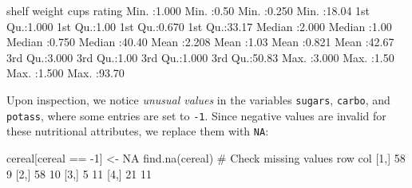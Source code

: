 \documentclass[
  11pt,
]{book}
\makeatletter
\newenvironment{Shaded}{}{}
\newcommand{\CommentTok}[1]{\textcolor[rgb]{0.36,0.36,0.36}{#1}}
\newcommand{\ConstantTok}[1]{#1}
\newcommand{\DecValTok}[1]{#1}
\newcommand{\FloatTok}[1]{#1}
\newcommand{\FunctionTok}[1]{#1}
\newcommand{\NormalTok}[1]{#1}
\newcommand{\OtherTok}[1]{\textcolor[rgb]{0.39,0.39,0.39}{#1}}
\newcommand{\SpecialCharTok}[1]{\textcolor[rgb]{0.39,0.39,0.39}{#1}}
\newenvironment{kframe}{%
\medskip{}
\setlength{\fboxsep}{.8em}
 \def\at@end@of@kframe{}%
 \ifinner\ifhmode%
  \def\at@end@of@kframe{\end{minipage}}%
  \begin{minipage}{\columnwidth}%
 \fi\fi%
 \def\FrameCommand##1{\hskip\@totalleftmargin \hskip-\fboxsep
 \colorbox{shadecolor}{##1}\hskip-\fboxsep
     \hskip-\linewidth \hskip-\@totalleftmargin \hskip\columnwidth}%
 \MakeFramed {\advance\hsize-\width
   \@totalleftmargin\z@ \linewidth\hsize
   \@setminipage}}%
 {\par\unskip\endMakeFramed%
 \at@end@of@kframe}
\renewenvironment{Shaded}{\begin{kframe}}{\end{kframe}}
\theoremstyle{definition}
\theoremstyle{definition}
\theoremstyle{definition}
\theoremstyle{definition}
\theoremstyle{remark}
\makeatother
\begin{document}
\begin{Shaded}
\begin{Highlighting}[]
\NormalTok{        shelf           weight          cups           rating     }
\NormalTok{    Min.   }\SpecialCharTok{:}\FloatTok{1.000}\NormalTok{   Min.   }\SpecialCharTok{:}\FloatTok{0.50}\NormalTok{   Min.   }\SpecialCharTok{:}\FloatTok{0.250}\NormalTok{   Min.   }\SpecialCharTok{:}\FloatTok{18.04}  
    \DecValTok{1}\NormalTok{st Qu.}\SpecialCharTok{:}\FloatTok{1.000}   \DecValTok{1}\NormalTok{st Qu.}\SpecialCharTok{:}\FloatTok{1.00}   \DecValTok{1}\NormalTok{st Qu.}\SpecialCharTok{:}\FloatTok{0.670}   \DecValTok{1}\NormalTok{st Qu.}\SpecialCharTok{:}\FloatTok{33.17}  
\NormalTok{    Median }\SpecialCharTok{:}\FloatTok{2.000}\NormalTok{   Median }\SpecialCharTok{:}\FloatTok{1.00}\NormalTok{   Median }\SpecialCharTok{:}\FloatTok{0.750}\NormalTok{   Median }\SpecialCharTok{:}\FloatTok{40.40}  
\NormalTok{    Mean   }\SpecialCharTok{:}\FloatTok{2.208}\NormalTok{   Mean   }\SpecialCharTok{:}\FloatTok{1.03}\NormalTok{   Mean   }\SpecialCharTok{:}\FloatTok{0.821}\NormalTok{   Mean   }\SpecialCharTok{:}\FloatTok{42.67}  
    \DecValTok{3}\NormalTok{rd Qu.}\SpecialCharTok{:}\FloatTok{3.000}   \DecValTok{3}\NormalTok{rd Qu.}\SpecialCharTok{:}\FloatTok{1.00}   \DecValTok{3}\NormalTok{rd Qu.}\SpecialCharTok{:}\FloatTok{1.000}   \DecValTok{3}\NormalTok{rd Qu.}\SpecialCharTok{:}\FloatTok{50.83}  
\NormalTok{    Max.   }\SpecialCharTok{:}\FloatTok{3.000}\NormalTok{   Max.   }\SpecialCharTok{:}\FloatTok{1.50}\NormalTok{   Max.   }\SpecialCharTok{:}\FloatTok{1.500}\NormalTok{   Max.   }\SpecialCharTok{:}\FloatTok{93.70}  
   
\end{Highlighting}
\end{Shaded}

Upon inspection, we notice \emph{unusual values} in the variables \texttt{sugars}, \texttt{carbo}, and \texttt{potass}, where some entries are set to \texttt{-1}. Since negative values are invalid for these nutritional attributes, we replace them with \texttt{NA}:

\begin{Shaded}
\begin{Highlighting}[]
\NormalTok{cereal[cereal }\SpecialCharTok{==} \SpecialCharTok{{-}}\DecValTok{1}\NormalTok{] }\OtherTok{\textless{}{-}} \ConstantTok{NA}
\FunctionTok{find.na}\NormalTok{(cereal)  }\CommentTok{\# Check missing values}
\NormalTok{        row col}
\NormalTok{   [}\DecValTok{1}\NormalTok{,]  }\DecValTok{58}   \DecValTok{9}
\NormalTok{   [}\DecValTok{2}\NormalTok{,]  }\DecValTok{58}  \DecValTok{10}
\NormalTok{   [}\DecValTok{3}\NormalTok{,]   }\DecValTok{5}  \DecValTok{11}
\NormalTok{   [}\DecValTok{4}\NormalTok{,]  }\DecValTok{21}  \DecValTok{11}
\end{Highlighting}
\end{Shaded}
\end{document}
